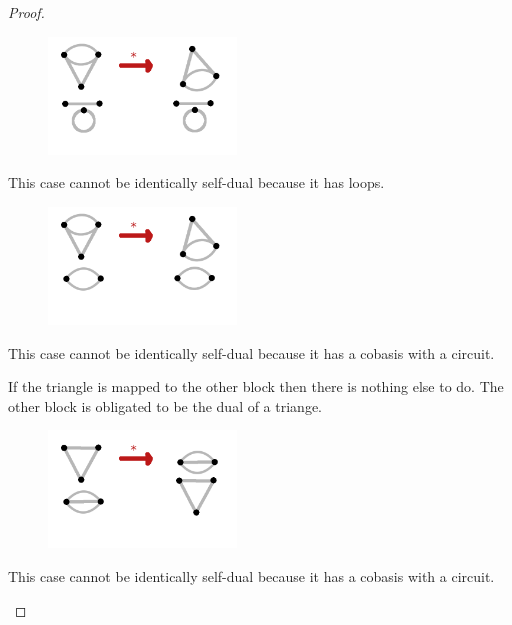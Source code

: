 \begin{proof}
\begin{enumerate}[label=(\roman*)]
\begin{itemize}
                        \begin{figure}[H]
                            \begin{center}
                            \includegraphics[width=5cm]{Test2/Problem1/4-1_0.png}
                            \end{center}                        
                        \end{figure}\pn    
                        This case cannot be identically self-dual because it has loops.
                        
                        \begin{figure}[H]
                            \begin{center}
                            \includegraphics[width=5cm]{Test2/Problem1/4-2.png}
                            \end{center}                        
                        \end{figure}\pn
                        This case cannot be identically self-dual because it has a cobasis with a circuit.
                        
                        If the triangle is mapped to the other block then there is nothing else to do. The other block is obligated to be
                        the dual of a triange.
                        \begin{figure}[H]
                            \begin{center}
                            \includegraphics[width=5cm]{Test2/Problem1/3-111.png}
                            \end{center}                        
                        \end{figure}\pn
                        This case cannot be identically self-dual because it has a cobasis with a circuit.
                        

\end{itemize}
\end{enumerate}
\end{proof}
